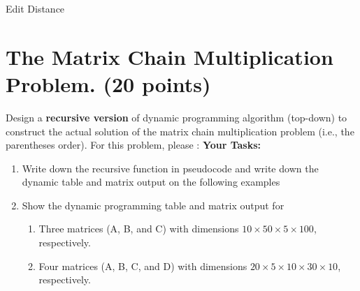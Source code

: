 \documentclass{article}[12pt]
\begin{document}
\begin{algorithm}[H]
 \caption{Edit Distance}

\end{algorithm}



\newpage
\section{The Matrix Chain Multiplication Problem. (20 points)}
Design a \textbf{recursive version} of dynamic programming algorithm (top-down) to construct the actual solution of the matrix chain multiplication problem (i.e., the parentheses order). For this problem, please :
\noindent\textbf{Your Tasks:}
\begin{enumerate}
\item Write down the recursive function in pseudocode and write down the dynamic table and matrix output on the following examples
\item Show the dynamic programming table and matrix output for 
    \begin{enumerate}
        \item  Three matrices (A, B, and C) with dimensions $10 \times 50 \times 5 \times 100$, respectively.
        \item Four matrices (A, B, C, and D) with dimensions $20 \times 5 \times 10 \times 30 \times 10$, respectively.
    \end{enumerate}

\end{enumerate}
\end{document}
